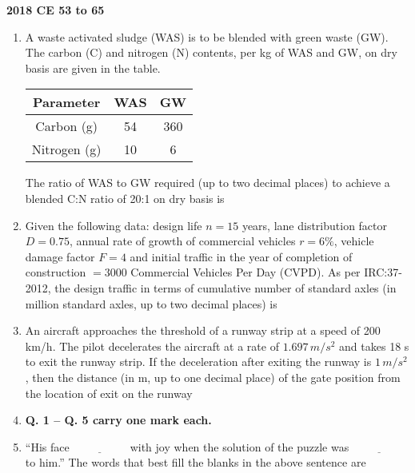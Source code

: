 \documentclass[journal]{IEEEtran}
\begin{document}
    
        \textbf{2018 CE 53 to 65}\\
\begin{enumerate}
	\item{
		A waste activated sludge (WAS) is to be blended with green waste (GW). The carbon (C) and nitrogen (N) contents, per kg of WAS and GW, on dry basis are given in the table.
		\begin{center}
		\begin{tabular}{|c|c|c|}
			\hline
			Parameter & WAS & GW \\ \hline
			Carbon (g) & 54 & 360 \\ \hline
			Nitrogen (g) & 10 & 6 \\
			\hline
		\end{tabular}
		\end{center}
		The ratio of WAS to GW required (up to two decimal places) to achieve a blended C:N ratio of 20:1 on dry basis is \underline{\hspace{1.5cm}}
	}
   	\item{
    	Given the following data: design life \( n = 15 \) years, lane distribution factor \( D = 0.75 \), annual rate of growth of commercial vehicles \( r = 6\% \), vehicle damage factor \( F = 4 \) and initial traffic in the year of completion of construction \( = 3000 \) Commercial Vehicles Per Day (CVPD). As per IRC:37-2012, the design traffic in terms of cumulative number of standard axles (in million standard axles, up to two decimal places) is \underline{\hspace{1.5cm}}
    }
    \item{
            An aircraft approaches the threshold of a runway strip at a speed of 200 km/h. The pilot decelerates the aircraft at a rate of \(1.697 \, m/s^2\) and takes 18 s to exit the runway strip. If the deceleration after exiting the runway is \(1 \, m/s^2\), then the distance (in m, up to one decimal place) of the gate position from the location of exit on the runway \underline{\hspace{1.5cm}}
        }
    \item[]{
    \textbf{Q. 1 – Q. 5 carry one mark each.}}
	\item{
        	
        	“His face \( \underline{\hspace{2cm}} \) with joy when the solution of the puzzle was \( \underline{\hspace{2cm}} \) to him.”
        	The words that best fill the blanks in the above sentence are
        	\begin{enumerate}
        	\end{enumerate}
        	
}
\end{enumerate}
\end{document}
